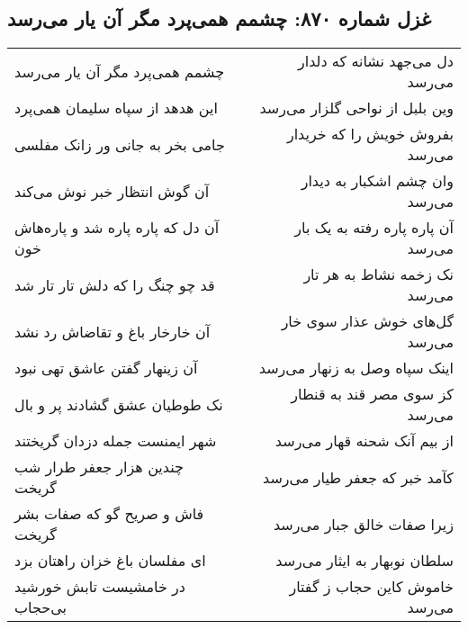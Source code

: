 \begin{center}
\section*{غزل شماره ۸۷۰: چشمم همی‌پرد مگر آن یار می‌رسد}
\label{sec:0870}
\begin{longtable}{l p{0.5cm} r}
چشمم همی‌پرد مگر آن یار می‌رسد
&&
دل می‌جهد نشانه که دلدار می‌رسد
\\
این هدهد از سپاه سلیمان همی‌پرد
&&
وین بلبل از نواحی گلزار می‌رسد
\\
جامی بخر به جانی ور زانک مفلسی
&&
بفروش خویش را که خریدار می‌رسد
\\
آن گوش انتظار خبر نوش می‌کند
&&
وان چشم اشکبار به دیدار می‌رسد
\\
آن دل که پاره پاره شد و پاره‌هاش خون
&&
آن پاره پاره رفته به یک بار می‌رسد
\\
قد چو چنگ را که دلش تار تار شد
&&
نک زخمه نشاط به هر تار می‌رسد
\\
آن خارخار باغ و تقاضاش رد نشد
&&
گل‌های خوش عذار سوی خار می‌رسد
\\
آن زینهار گفتن عاشق تهی نبود
&&
اینک سپاه وصل به زنهار می‌رسد
\\
نک طوطیان عشق گشادند پر و بال
&&
کز سوی مصر قند به قنطار می‌رسد
\\
شهر ایمنست جمله دزدان گریختند
&&
از بیم آنک شحنه قهار می‌رسد
\\
چندین هزار جعفر طرار شب گریخت
&&
کآمد خبر که جعفر طیار می‌رسد
\\
فاش و صریح گو که صفات بشر گریخت
&&
زیرا صفات خالق جبار می‌رسد
\\
ای مفلسان باغ خزان راهتان بزد
&&
سلطان نوبهار به ایثار می‌رسد
\\
در خامشیست تابش خورشید بی‌حجاب
&&
خاموش کاین حجاب ز گفتار می‌رسد
\\
\end{longtable}
\end{center}
